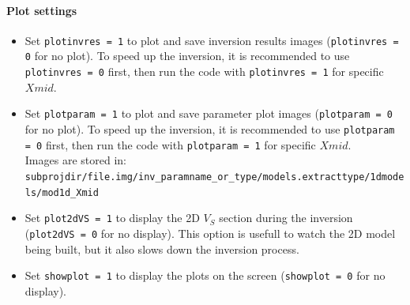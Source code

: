 \documentclass[twoside,a4paper]{article}
\begin{document}
\paragraph{Plot settings}
\begin{itemize}[leftmargin=*]
\setlength\itemsep{2ex}
\item Set \verb|plotinvres = 1| to plot and save inversion results images (\verb|plotinvres = 0| for no plot). To speed up the inversion, it is recommended to use \verb|plotinvres = 0| first, then run the code with \verb|plotinvres = 1| for specific $Xmid$.

\item Set \verb|plotparam = 1| to plot and save parameter plot images (\verb|plotparam = 0| for no plot). To speed up the inversion, it is recommended to use \verb|plotparam = 0| first, then run the code with \verb|plotparam = 1| for specific $Xmid$.\\[1ex]
Images are stored in:\\
\verb|subprojdir/file.img/inv_paramname_or_type/models.extracttype/1dmodels/mod1d_Xmid| 

\item Set \verb|plot2dVS = 1| to display the 2D $V_S$ section during the inversion (\verb|plot2dVS = 0| for no display). This option is usefull to watch the 2D model being built, but it also slows down the inversion process.

\item Set \verb|showplot = 1| to display the plots on the screen (\verb|showplot = 0| for no display).
\end{itemize}
\end{document}
